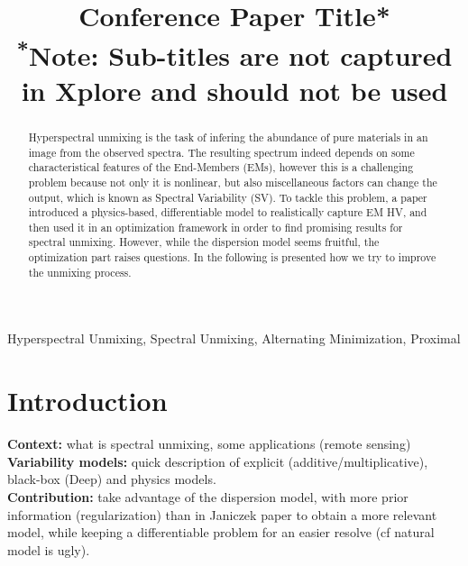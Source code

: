 \documentclass[conference]{IEEEtran}
\begin{document}
\title{Conference Paper Title*\\
{\footnotesize \textsuperscript{*}Note: Sub-titles are not captured in Xplore and
should not be used}
}

\author{
\and
{}
}

\maketitle

\begin{abstract}
  Hyperspectral unmixing is the task of infering the abundance of pure materials in an image from the observed spectra. The resulting spectrum indeed depends on some characteristical features of the End-Members (EMs), however this is a challenging problem because not only it is nonlinear, but also miscellaneous factors can change the output, which is known as Spectral Variability (SV). To tackle this problem, a paper~\cite{janiczek_differentiable_2020} introduced a physics-based, differentiable model to realistically capture EM HV, and then used it in an optimization framework in order to find promising results for spectral unmixing. However, while the dispersion model seems fruitful, the optimization part raises questions. In the following is presented how we try to improve the unmixing process.
\end{abstract}

\begin{IEEEkeywords}
Hyperspectral Unmixing, Spectral Unmixing, Alternating Minimization, Proximal
\end{IEEEkeywords}

\section{Introduction}
\textbf{Context:} what is spectral unmixing, some applications (remote sensing)\\
\textbf{Variability models:} quick description of explicit (additive/multiplicative), black-box (Deep) and physics models.\\
\textbf{Contribution:} take advantage of the dispersion model, with more prior information (regularization) than in Janiczek paper to obtain a more relevant model, while keeping a differentiable problem for an easier resolve (cf natural model is ugly).\\
\end{document}
